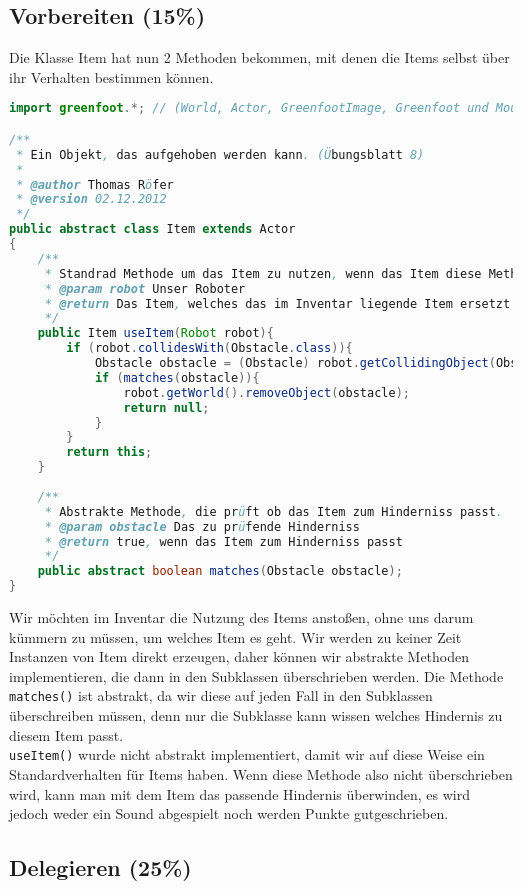 \documentclass{pi1}
\begin{document}
\subsection{Vorbereiten (15\%)}

Die Klasse Item hat nun 2 Methoden bekommen, mit denen die Items selbst über ihr Verhalten bestimmen können.
\begin{lstlisting}[caption={Klasse \emph{Item}}, firstnumber=1, language=Java]
import greenfoot.*; // (World, Actor, GreenfootImage, Greenfoot und MouseInfo)

/**
 * Ein Objekt, das aufgehoben werden kann. (Übungsblatt 8)
 * 
 * @author Thomas Röfer
 * @version 02.12.2012
 */
public abstract class Item extends Actor
{
    /**
     * Standrad Methode um das Item zu nutzen, wenn das Item diese Methode nicht überschreibt
     * @param robot Unser Roboter
     * @return Das Item, welches das im Inventar liegende Item ersetzt
     */
    public Item useItem(Robot robot){
        if (robot.collidesWith(Obstacle.class)){
            Obstacle obstacle = (Obstacle) robot.getCollidingObject(Obstacle.class);
            if (matches(obstacle)){
                robot.getWorld().removeObject(obstacle);
                return null;
            }
        }
        return this;
    }
    
    /**
     * Abstrakte Methode, die prüft ob das Item zum Hinderniss passt.
     * @param obstacle Das zu prüfende Hinderniss
     * @return true, wenn das Item zum Hinderniss passt
     */
    public abstract boolean matches(Obstacle obstacle);
}

\end{lstlisting}

Wir möchten im Inventar die Nutzung des Items anstoßen, ohne uns darum kümmern zu müssen, um welches Item es geht.
Wir werden zu keiner Zeit Instanzen von Item direkt erzeugen, daher können wir abstrakte Methoden implementieren, die dann in den Subklassen überschrieben werden. Die Methode \texttt{matches()} ist abstrakt, da wir diese auf jeden Fall in den Subklassen überschreiben müssen, denn nur die Subklasse kann wissen welches Hindernis zu diesem Item passt.\\
\texttt{useItem()} wurde nicht abstrakt implementiert, damit wir auf diese Weise ein Standardverhalten für Items haben. Wenn diese Methode also nicht überschrieben wird, kann man mit dem Item das passende Hindernis überwinden, es wird jedoch weder ein Sound abgespielt noch werden Punkte gutgeschrieben.

\subsection{Delegieren (25\%)}
\end{document}
